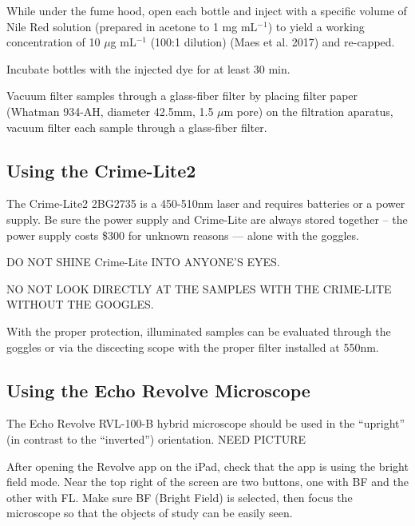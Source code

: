 \documentclass[12pt]{../SOP4_alpha}\usepackage[]{graphicx}\usepackage[]{color}
\begin{document}
\NP While under the fume hood, open each bottle and inject with a specific volume of Nile Red solution (prepared in acetone to 1 mg mL$^{-1}$) to yield a working concentration of 10 $\mu$g mL$^{-1}$ (100:1 dilution) (Maes et al. 2017) and re-capped. 

\NP Incubate bottles with the injected dye for at least 30 min. 

\NP Vacuum filter samples through a glass-fiber filter by placing filter paper (Whatman 934-AH, diameter 42.5mm, 1.5 $\mu$m pore) on the filtration aparatus, vacuum filter each sample through a glass-fiber filter.





\subsection{Using the Crime-Lite2}

\NP The Crime-Lite2 2BG2735 is a 450-510nm laser and requires batteries or a power supply. Be sure the power supply and Crime-Lite are always stored together -- the power supply costs \$300 for unknown reasons --- alone with the goggles.

\NP DO NOT SHINE Crime-Lite INTO ANYONE'S EYES.

\NP NO NOT LOOK DIRECTLY AT THE SAMPLES WITH THE CRIME-LITE WITHOUT THE GOOGLES.

\NP With the proper protection, illuminated samples can be evaluated through the goggles or via the discecting  scope with the proper filter installed at 550nm. 
  
\subsection{Using the Echo Revolve Microscope}

\NP The Echo Revolve RVL-100-B hybrid microscope should be used in the ``upright'' (in contrast to the ``inverted'') orientation. NEED PICTURE

\NP After opening the Revolve app on the iPad, check that the app is using the bright field mode. Near the top right of the screen are two buttons, one with BF and the other with FL. Make sure BF (Bright Field) is selected, then focus the microscope so that the objects of study can be easily seen. 
\end{document}
